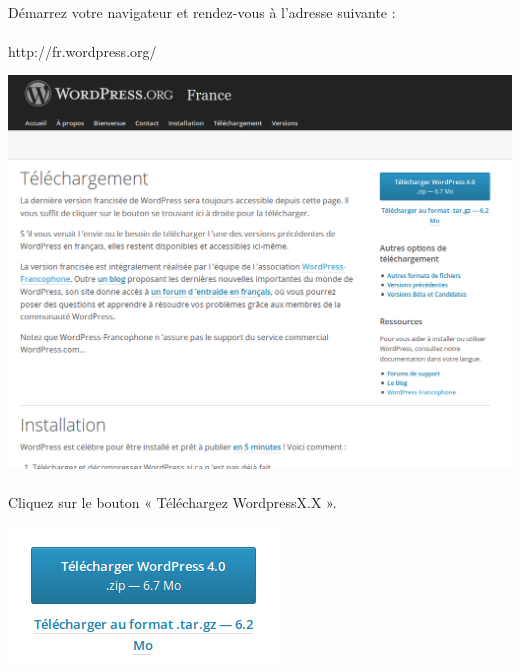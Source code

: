 \documentclass[10pt,a4paper]{article}
\begin{document}
\paragraph{}Démarrez votre navigateur et rendez-vous à l'adresse suivante :
\paragraph{}http://fr.wordpress.org/
\begin{center}
\includegraphics[scale=0.35]{img/0001.png}
\end{center}
\paragraph{}Cliquez sur le bouton « Téléchargez WordpressX.X ».
\begin{center}
\includegraphics[scale=0.7]{img/0002.png}
\end{center}
\end{document}
